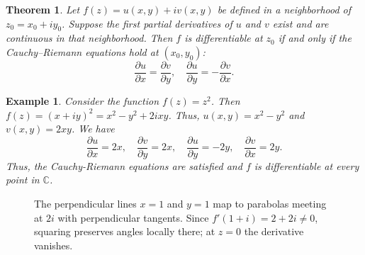 \documentclass{report}
\newtheorem{theorem}{Theorem}
\newtheorem{example}{Example}
\begin{document}
\begin{theorem}
    Let $f(z)=u(x,y)+iv(x,y)$ be defined in a neighborhood of
    $z_0=x_0+iy_0$. Suppose the first partial derivatives of $u$ and $v$
    exist and are continuous in that neighborhood. Then $f$ is
    differentiable at $z_0$ if and only if the Cauchy--Riemann equations
    hold at $(x_0,y_0)$:
    \[
        \frac{\partial u}{\partial x} = \frac{\partial v}{\partial y}, \quad \frac{\partial u}{\partial y} = -\frac{\partial v}{\partial x}.
    \]
    
\end{theorem}



\begin{example}
    
    Consider the function $f(z) = z^2$. Then $f(z) = (x + iy)^2 = x^2 - y^2 + 2ixy$. Thus, $u(x,y) = x^2 - y^2$ and $v(x,y) = 2xy$. We have 
    \[
        \frac{\partial u}{\partial x} = 2x, \quad \frac{\partial v}{\partial y} = 2x, \quad \frac{\partial u}{\partial y} = -2y, \quad \frac{\partial v}{\partial x} = 2y.
    \]
    Thus, the Cauchy-Riemann equations are satisfied and $f$ is differentiable at every point in $\mathbb{C}$.
\end{example}

\begin{figure}[H]
    \centering
    \caption{The perpendicular lines $x=1$ and $y=1$ map to parabolas meeting at $2i$ with perpendicular tangents. Since $f\prime(1+i)=2+2i\ne0$, squaring preserves angles locally there; at $z=0$ the derivative vanishes.}
    \label{fig:square-cr}
\end{figure}
\end{document}
